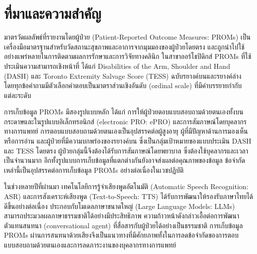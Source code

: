 \section{ที่มาและความสำคัญ}
\label{sec:intro}

มาตรวัดผลลัพธ์ที่รายงานโดยผู้ป่วย (Patient-Reported Outcome Measures: PROMs) เป็นเครื่องมือมาตรฐานสำหรับวัดสถานะสุขภาพและอาการจากมุมมองของผู้ป่วยโดยตรง และถูกนำไปใช้อย่างแพร่หลายในการติดตามผลการรักษาและการวิจัยทางคลินิก \citep{Black2013} ในสาขาออร์โธปิดิกส์ PROMs ที่ใช้ประเมินความสามารถเชิงหน้าที่ ได้แก่ Disabilities of the Arm, Shoulder and Hand (DASH) และ Toronto Extremity Salvage Score (TESS) ฉบับรยางค์บนและรยางค์ล่าง โดยทุกข้อคำถามมีตัวเลือกคำตอบเป็นมาตราส่วนเชิงอันดับ (ordinal scale) ที่มีคำบรรยายกำกับแต่ละระดับ

การเก็บข้อมูล PROMs มีสองรูปแบบหลัก ได้แก่ การให้ผู้ป่วยตอบแบบสอบถามด้วยตนเองทั้งบนกระดาษและในรูปแบบอิเล็กทรอนิกส์ (electronic PRO: ePRO) และการสัมภาษณ์โดยบุคลากรทางการแพทย์ การตอบแบบสอบถามด้วยตนเองเป็นอุปสรรคต่อผู้สูงอายุ ผู้ที่มีปัญหาด้านการมองเห็นหรือการอ่าน และผู้ป่วยที่มีความบกพร่องของรยางค์บน ซึ่งเป็นกลุ่มเป้าหมายของแบบประเมิน DASH และ TESS โดยตรง ผู้ป่วยกลุ่มนี้จึงต้องได้รับการสัมภาษณ์โดยพยาบาล ซึ่งต้องใช้บุคลากรและเวลาเป็นจำนวนมาก อีกทั้งรูปแบบการเก็บข้อมูลที่แตกต่างกันยังอาจส่งผลต่อคุณภาพของข้อมูล \citep{Bowling2005} ข้อจำกัดเหล่านี้เป็นอุปสรรคต่อการเก็บข้อมูล PROMs อย่างต่อเนื่องในเวชปฏิบัติ

ในช่วงหลายปีที่ผ่านมา เทคโนโลยีการรู้จำเสียงพูดอัตโนมัติ (Automatic Speech Recognition: ASR) \citep{Aung2024, TyphoonWhisperTurbo} และการสังเคราะห์เสียงพูด (Text-to-Speech: TTS) \citep{Pipatanakul2024, Zhu2026OmniVoice} ได้รับการพัฒนาให้รองรับภาษาไทยได้ดีขึ้นอย่างต่อเนื่อง ประกอบกับโมเดลภาษาขนาดใหญ่ (Large Language Models: LLMs) สามารถประมวลผลภาษาธรรมชาติได้อย่างมีประสิทธิภาพ \citep{Yang2025Qwen3, Thirunavukarasu2023} ความก้าวหน้าดังกล่าวเอื้อต่อการพัฒนาตัวแทนสนทนา (conversational agent) ที่สื่อสารกับผู้ป่วยได้อย่างเป็นธรรมชาติ \citep{Laranjo2018, An2025} 
การเก็บข้อมูล PROMs ผ่านการสนทนาด้วยเสียงจึงเป็นแนวทางที่มีศักยภาพทั้งในการลดข้อจำกัดของการตอบแบบสอบถามด้วยตนเองและการลดภาระงานของบุคลากรทางการแพทย์

